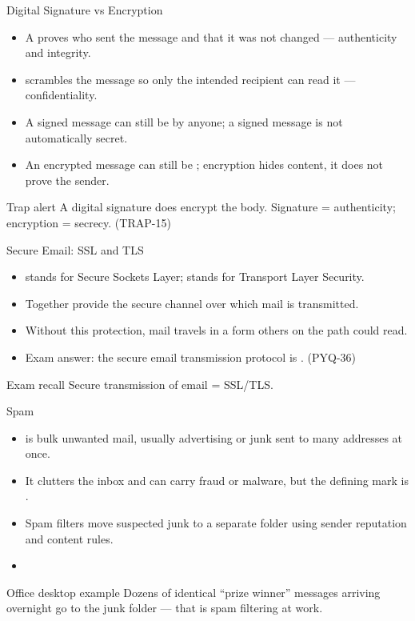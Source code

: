 \documentclass[aspectratio=169]{beamer}
\begin{document}
\begin{frame}{Digital Signature vs Encryption}
  \begin{itemize}
    \item A  proves who sent the message and that
      it was not changed --- authenticity and integrity.
    \item {} scrambles the message so only the intended
      recipient can read it --- confidentiality.
    \item A signed message can still be  by anyone; a signed
      message is not automatically secret.
    \item An encrypted message can still be ; encryption
      hides content, it does not prove the sender.
  \end{itemize}
  \begin{alertblock}{Trap alert}
    A digital signature does  encrypt the body. Signature =
    authenticity; encryption = secrecy. (TRAP-15)
  \end{alertblock}
\end{frame}

\begin{frame}{Secure Email: SSL and TLS}
  \begin{itemize}
    \item {} stands for Secure Sockets Layer;  stands
      for Transport Layer Security.
    \item Together  provide the secure channel over which
      mail is transmitted.
    \item Without this protection, mail travels in a form others on the
      path could read.
    \item Exam answer: the secure email transmission protocol is
      . (PYQ-36)
  \end{itemize}
  \begin{block}{Exam recall}
    Secure transmission of email = SSL/TLS.
  \end{block}
\end{frame}

\begin{frame}{Spam}
  \begin{itemize}
    \item {} is bulk unwanted mail, usually advertising or junk
      sent to many addresses at once.
    \item It clutters the inbox and can carry fraud or malware, but the
      defining mark is .
    \item Spam filters move suspected junk to a separate folder using
      sender reputation and content rules.
    \item {}
  \end{itemize}
  \begin{exampleblock}{Office desktop example}
    Dozens of identical ``prize winner'' messages arriving overnight go
    to the junk folder --- that is spam filtering at work.
  \end{exampleblock}
\end{frame}
\end{document}
